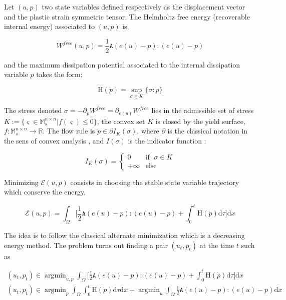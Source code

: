 \documentclass[10pt,oneside]{memoir}
\DeclareMathOperator*{\argmin}{argmin}
\begin{document}
Let $(u,p)$ two state variables defined respectively as the displacement vector and the plastic strain symmetric tensor. The Helmholtz free energy (recoverable internal energy) associated to $(u,p)$ is, 


$$ W^{free}(u,p)=\frac{1}{2}\mathtt{A} (e(u)-p):(e(u)-p) $$

and the maximum dissipation potential associated to the internal dissipation variable $p$ takes the form:

$$ \mathrm{H} (\dot{p})=\sup_{\sigma \in K} \{\sigma: \dot{p} \} $$

The stress denoted $\sigma= -\partial_p W^{free} = \partial_{e(u)} W^{free}$ lies in the admissible set of stress $K:=\{ \varsigma \in \mathbb{M}^{n\times n}_s | f(\varsigma) \leq 0 \}$, the convex set $K$ is closed by the yield surface, $f:\mathbb{M}^{n\times n}_s \rightarrow \mathbb{R}$. The flow rule is $\dot{p} \in \partial I_K(\sigma)$, where $\partial$ is the classical notation in the sens of convex analysis , and $I(\sigma) $ is the indicator function :

$$
I_K(\sigma) = \left\{
    \begin{array}{ll}
        0 & \mbox{if } \; \sigma \in K \\
        +\infty & \mbox{else}
    \end{array}
\right.
$$


Minimizing $\mathcal{E}(u,p)$ consists in choosing the stable state variable trajectory which conserve the energy,

$$ \mathcal{E}(u,p)= \int_{\Omega} \Big[  \frac{1}{2} \mathtt{A} (e(u)-p) :  (e(u)-p) + \int_0^t \mathrm{H} (\dot{p}) \mathrm{d} \tau \Big] \mathrm{d} x $$


The idea is to follow the classical alternate minimization which is a decreasing energy method. The problem turns out finding a pair $(u_t,p_t)$ at the time $t$ such as 


\begin{equation*}
\begin{split}
(u_t,p_t) \in \argmin_{u,p}  \int_{\Omega} \Big[  \frac{1}{2} \mathtt{A} (e(u)-p) :  (e(u)-p) + \int_0^t \mathrm{H} (\dot{p}) \mathrm{d} \tau \Big] \mathrm{d} x\\
(u_t,p_t) \in \argmin_{p}  \int_{\Omega} \int_0^t \mathrm{H} (\dot{p}) \mathrm{d} \tau  \mathrm{d} x + \argmin_{u}  \int_{\Omega} \frac{1}{2} \mathtt{A} (e(u)-p) :  (e(u)-p) \mathrm{d} x
\end{split}
\end{equation*}
\end{document}
